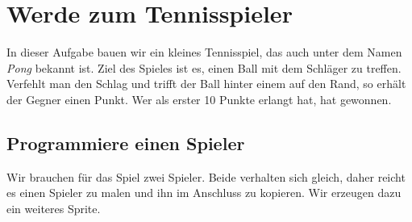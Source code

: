 \section{Werde zum Tennisspieler}
In dieser Aufgabe bauen wir ein kleines Tennisspiel, das auch unter dem Namen  \emph{Pong} bekannt ist. Ziel des Spieles ist es, einen Ball mit dem Schläger zu treffen. Verfehlt man den Schlag und trifft der Ball hinter einem auf den Rand, so erhält der Gegner einen Punkt. Wer als erster 10 Punkte erlangt hat, hat gewonnen.
\subsection{Programmiere einen Spieler}
Wir brauchen für das Spiel zwei Spieler. Beide verhalten sich gleich, daher reicht es einen Spieler zu malen und ihn im Anschluss zu kopieren. Wir erzeugen dazu ein weiteres Sprite.

